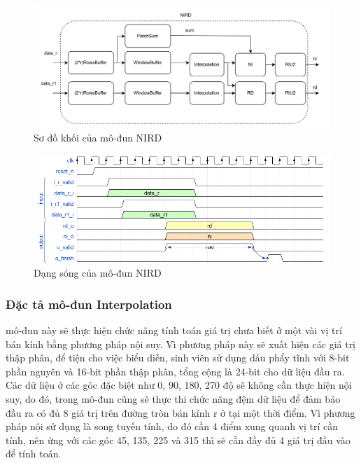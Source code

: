 \begin{figure}[!ht]
    \centering
    \includegraphics[width=\linewidth]{figures/nirdArch.png}
    \caption{Sơ đồ khối của mô-đun NIRD}
    \label{fig:nirdArch}
\end{figure}
\begin{figure}[!ht]
    \centering
    \includegraphics[width=\linewidth]{figures/nird.png}
    \caption{Dạng sóng của mô-đun NIRD}
    \label{fig:nird}
\end{figure}

\subsubsection{Đặc tả mô-đun Interpolation}
mô-đun này sẽ thực hiện chức năng tính toán giá trị chưa biết ở một vài vị trí bán kính bằng phương pháp nội suy. Vì phương pháp này sẽ xuất hiện các giá trị thập phân, để tiện cho việc biểu diễn, sinh viên sử dụng dấu phẩy tĩnh với 8-bit phần nguyên và 16-bit phần thập phân, tổng cộng là 24-bit cho dữ liệu đầu ra. Các dữ liệu ở các góc đặc biệt như 0, 90, 180, 270 độ sẽ không cần thực hiện nội suy, do đó, trong mô-đun cũng sẽ thực thi chức năng đệm dữ liệu để đảm bảo đầu ra có đủ 8 giá trị trên đường tròn bán kính r ở tại một thời điểm. Vì phương pháp nội sử dụng là song tuyến tính, do đó cần 4 điểm xung quanh vị trí cần tính, nên ứng với các góc 45, 135, 225 và 315 thì sẽ cần đầy đủ 4 giá trị đầu vào để tính toán.

